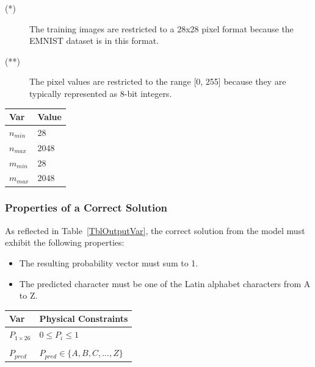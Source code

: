 \documentclass[12pt]{article}
\begin{document}
\noindent 
\begin{description}
\item[(*)] The training images are restricted to a 28x28 pixel format because
the EMNIST dataset is in this format.
\item[(**)] The pixel values are restricted to the range [0, 255] because they
are typically represented as 8-bit integers.
\end{description}

\begin{table}[!h]
\caption{Specification Parameter Values} \label{TblSpecParams}
\renewcommand{\arraystretch}{1.2}
\noindent \begin{longtable*}{l l} 
  \toprule
  \textbf{Var} & \textbf{Value} \\
  \midrule 
  $n_{min}$ & 28 \\
  $n_{max}$ & 2048 \\
  $m_{min}$ & 28 \\
  $m_{max}$ & 2048 \\
  \bottomrule
\end{longtable*}
\end{table}

\subsubsection{Properties of a Correct Solution} \label{sec_CorrectSolution}

\noindent
As reflected in Table~\ref{TblOutputVar}, the correct solution from the model
must exhibit the following properties:

\begin{itemize}
  \item The resulting probability vector must sum to 1.
  \item The predicted character must be one of the Latin alphabet
  characters from A to Z. 
\end{itemize}


\begin{table}[!h]
\caption{Output Variables} \label{TblOutputVar}
\renewcommand{\arraystretch}{1.2}
\noindent \begin{longtable*}{l l} 
  \toprule
  \textbf{Var} & \textbf{Physical Constraints} \\
  \midrule 
  $P_{1 \times 26}$ & $0 \leq P_i \leq 1$ \\
  \\
  $P_{pred}$ & $P_{pred} \in \{A, B, C, ..., Z\}$ \\
  \bottomrule
\end{longtable*}
\end{table}
\end{document}
